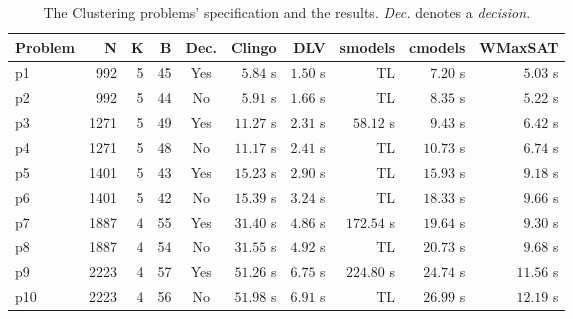 \documentclass[]{article}
\begin{document}
\begin{table}[h]
\caption{The Clustering problems' specification and the results. \textit{Dec.} denotes a \textit{decision}.}
\label{tab:clustering_results}
\vspace{1em}
\scriptsize
\begin{tabular}{lrrrcrrrrr}
\toprule
Problem & N & K & B & Dec. & Clingo & DLV & smodels & cmodels & WMaxSAT \\
\midrule
p1 & 992 & 5 & 45 & Yes  & $ 5.84 $ s    & $ 1.50 $ s    & TL            & $ 7.20 $ s    & $ 5.03 $ s \\
p2 & 992 & 5 & 44 & No   & $ 5.91 $ s    & $ 1.66 $ s    & TL            & $ 8.35 $ s    & $ 5.22 $ s \\
p3 & 1271 & 5 & 49 & Yes & $ 11.27 $ s   & $ 2.31 $ s    & $ 58.12 $ s   & $ 9.43 $ s    & $ 6.42 $ s \\
p4 & 1271 & 5 & 48 & No  & $ 11.17 $ s   & $ 2.41 $ s    & TL            & $ 10.73 $ s   & $ 6.74 $ s \\
p5 & 1401 & 5 & 43 & Yes & $ 15.23 $ s   & $ 2.90 $ s    & TL            & $ 15.93 $ s   & $ 9.18 $ s \\
p6 & 1401 & 5 & 42 & No  & $ 15.39 $ s   & $ 3.24 $ s    & TL            & $ 18.33 $ s   & $ 9.66 $ s \\
p7 & 1887 & 4 & 55 & Yes & $ 31.40 $ s   & $ 4.86 $ s    & $ 172.54 $ s  & $ 19.64 $ s   & $ 9.30 $ s \\
p8 & 1887 & 4 & 54 & No  & $ 31.55 $ s   & $ 4.92 $ s    & TL            & $ 20.73 $ s   & $ 9.68 $ s \\
p9 & 2223 & 4 & 57 & Yes & $ 51.26 $ s   & $ 6.75 $ s    & $ 224.80 $ s  & $ 24.74 $ s   & $ 11.56 $ s \\
p10 & 2223 & 4 & 56 & No  & $ 51.98 $ s   & $ 6.91 $ s    & TL            & $ 26.99 $ s   & $ 12.19 $ s \\
\bottomrule
\end{tabular}
\end{table}



\end{document}
